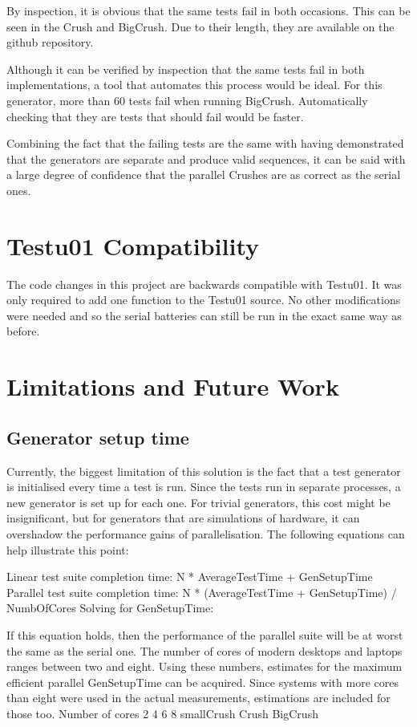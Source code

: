 By inspection, it is obvious that the same tests fail in both occasions. This can be seen in the Crush and BigCrush. Due to their length, they are available on the github repository\cite{github-repo}.

Although it can be verified by inspection that the same tests fail in both implementations, a tool that automates this process would be ideal. For this generator, more than 60 tests fail when running BigCrush. Automatically checking that they are tests that should fail would be faster.

Combining the fact that the failing tests are the same with having demonstrated that the generators are separate and produce valid sequences, it can be said with a large degree of confidence that the parallel Crushes are as correct as the serial ones.

\section{Testu01 Compatibility}
The code changes in this project are backwards compatible with Testu01. It was only required to add one function to the Testu01 source. No other modifications were needed and so the serial batteries can still be run in the exact same way as before.


\section{Limitations and Future Work}

\subsection{Generator setup time}
Currently, the biggest limitation of this solution is the fact that a test generator is initialised every time a test is run. Since the tests run in separate processes, a new generator is set up for each one.
For trivial generators, this cost might be insignificant, but for generators that are simulations of hardware, it can overshadow the performance gains of parallelisation. The following equations can help illustrate this point:

Linear test suite completion time: N * AverageTestTime + GenSetupTime
Parallel test suite completion time: N * (AverageTestTime + GenSetupTime) / NumbOfCores
Solving for GenSetupTime:

If this equation holds, then the performance of the parallel suite will be at worst the same as the serial one.
The number of cores of modern desktops and laptops ranges between two and eight. Using these numbers, estimates for the maximum efficient parallel GenSetupTime can be acquired. Since systems with more cores than eight were used in the actual measurements, estimations are included for those too.
Number of cores
2 4 6 8
smallCrush
Crush
BigCrush

